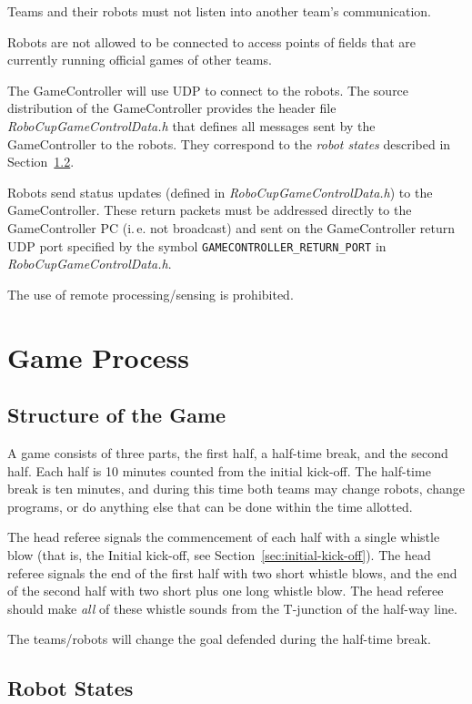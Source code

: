 \documentclass[12pt]{article}
\newcommand{\ie}{\mbox{i.\,e.}\xspace}
\newcommand{\cf}{see\xspace}
\begin{document}
Teams and their robots must not listen into another team's communication.

Robots are not allowed to be connected to access points of fields that are currently running official games of other teams.

The GameController will use UDP to connect to the robots. The source distribution of the GameController provides the header file \emph{RoboCupGameControlData.h} that defines all messages sent by the GameController to the robots. They correspond to the \emph{robot states} described in Section~\ref{sec:robot_states}.

Robots send status updates (defined in \emph{RoboCupGameControlData.h}) to the GameController. These return packets must be addressed directly to the GameController PC (\ie not broadcast) and sent on the GameController return UDP port specified by the symbol \verb!GAMECONTROLLER_RETURN_PORT! in \emph{RoboCupGameControlData.h}.

The use of remote processing/sensing is prohibited.


\newpage


\section{Game Process}
\label{sec:game_process}

\subsection{Structure of the Game}
\label{sec:game_struct}

A game consists of three parts, the first half, a half-time break, and the second half. Each half is 10 minutes counted from the initial kick-off.
The half-time break is ten minutes, and during this time both teams may change robots, change programs, or do anything else that can be done within the time allotted.

The head referee signals the commencement of each half with a single whistle blow (that is, the Initial kick-off, \cf Section~\ref{sec:initial-kick-off}).
The head referee signals the end of the first half with two short whistle blows, and the end of the second half with two short plus one long whistle blow.
The head referee should make \textit{all} of these whistle sounds from the T-junction of the half-way line.

The teams/robots will change the goal defended during the half-time break.

\subsection{Robot States}
\label{sec:robot_states}
\end{document}

